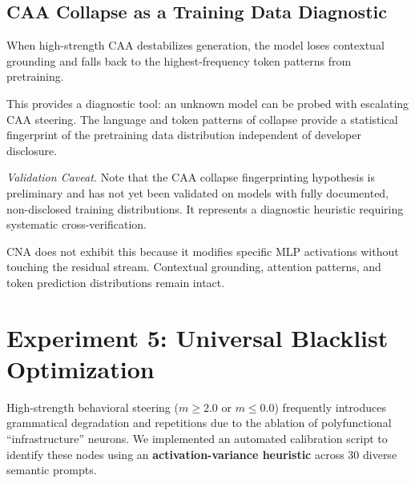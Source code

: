 \documentclass[11pt]{article}
\begin{document}
\subsection{CAA Collapse as a Training Data Diagnostic}

When high-strength CAA destabilizes generation, the model loses contextual grounding and falls back to the highest-frequency token patterns from pretraining.

\begin{table}[h]
\centering
\caption{CAA Collapse Language Profiles}
\label{tab:collapse}
\end{table}

This provides a diagnostic tool: an unknown model can be probed with escalating CAA steering. The language and token patterns of collapse provide a statistical fingerprint of the pretraining data distribution independent of developer disclosure. 

\textit{Validation Caveat.} Note that the CAA collapse fingerprinting hypothesis is preliminary and has not yet been validated on models with fully documented, non-disclosed training distributions. It represents a diagnostic heuristic requiring systematic cross-verification.

CNA does not exhibit this because it modifies specific MLP activations without touching the residual stream. Contextual grounding, attention patterns, and token prediction distributions remain intact.

\section{Experiment 5: Universal Blacklist Optimization}

High-strength behavioral steering ($m \ge 2.0$ or $m \le 0.0$) frequently introduces grammatical degradation and repetitions due to the ablation of polyfunctional ``infrastructure'' neurons. We implemented an automated calibration script to identify these nodes using an \textbf{activation-variance heuristic} across 30 diverse semantic prompts.
\end{document}
